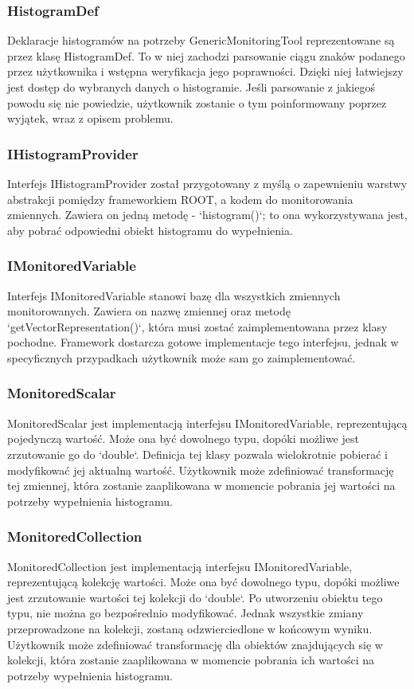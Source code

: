 \subsubsection{HistogramDef}
Deklaracje histogramów na potrzeby GenericMonitoringTool reprezentowane są przez klasę HistogramDef.
To w niej zachodzi parsowanie ciągu znaków podanego przez użytkownika i wstępna weryfikacja jego poprawności.
Dzięki niej łatwiejszy jest dostęp do wybranych danych o histogramie. 
Jeśli parsowanie z jakiegoś powodu się nie powiedzie, użytkownik zostanie o tym poinformowany poprzez wyjątek, wraz z opisem problemu.

\subsubsection{IHistogramProvider}
Interfejs IHistogramProvider został przygotowany z myślą o zapewnieniu warstwy abstrakcji pomiędzy frameworkiem ROOT, a kodem do monitorowania zmiennych. 
Zawiera on jedną metodę - `histogram()`; to ona wykorzystywana jest, aby pobrać odpowiedni obiekt histogramu do wypełnienia.

\subsubsection{IMonitoredVariable}
Interfejs IMonitoredVariable stanowi bazę dla wszystkich zmiennych monitorowanych. 
Zawiera on nazwę zmiennej oraz metodę `getVectorRepresentation()`, która musi zostać zaimplementowana przez klasy pochodne.
Framework dostarcza gotowe implementacje tego interfejsu, jednak w specyficznych przypadkach użytkownik może sam go zaimplementować.  

\subsubsection{MonitoredScalar}
MonitoredScalar jest implementacją interfejsu IMonitoredVariable, reprezentującą pojedynczą wartość. 
Może ona być dowolnego typu, dopóki możliwe jest zrzutowanie go do `double`.
Definicja tej klasy pozwala wielokrotnie pobierać i modyfikować jej aktualną wartość.
Użytkownik może zdefiniować transformację tej zmiennej, która zostanie zaaplikowana w momencie pobrania jej wartości na potrzeby wypełnienia histogramu.

\subsubsection{MonitoredCollection}
MonitoredCollection jest implementacją interfejsu IMonitoredVariable, reprezentującą kolekcję wartości. 
Może ona być dowolnego typu, dopóki możliwe jest zrzutowanie wartości tej kolekcji do `double`.
Po utworzeniu obiektu tego typu, nie można go bezpośrednio modyfikować.
Jednak wszystkie zmiany przeprowadzone na kolekcji, zostaną odzwierciedlone w końcowym wyniku.
Użytkownik może zdefiniować transformację dla obiektów znajdujących się w kolekcji, która zostanie zaaplikowana w momencie pobrania ich wartości na potrzeby wypełnienia histogramu.


